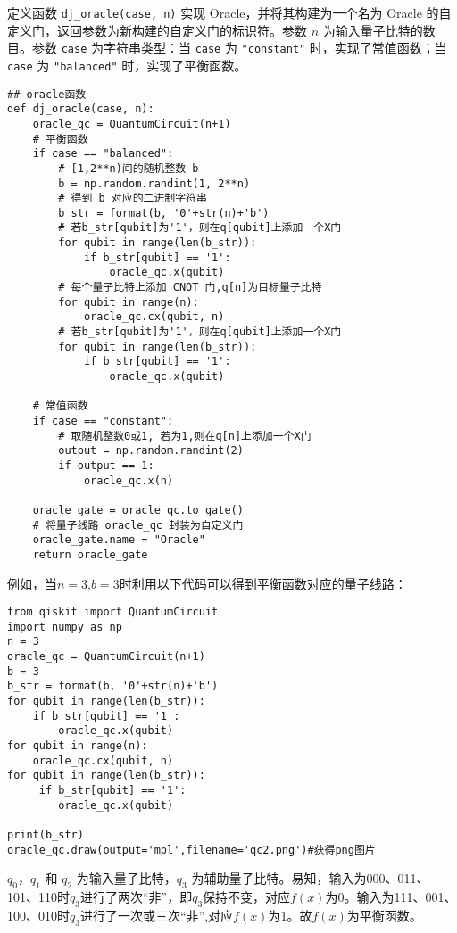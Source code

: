 定义函数 \texttt{dj\_oracle(case, n)} 实现 Oracle，并将其构建为一个名为 Oracle 的自定义门，返回参数为新构建的自定义门的标识符。参数 $n$ 为输入量子比特的数目。参数 \texttt{case} 为字符串类型：当 \texttt{case} 为 \texttt{"constant"} 时，实现了常值函数；当 \texttt{case} 为 \texttt{"balanced"} 时，实现了平衡函数。
\begin{py}
\begin{lstlisting}
## oracle函数
def dj_oracle(case, n):
    oracle_qc = QuantumCircuit(n+1)
    # 平衡函数
    if case == "balanced":
        # [1,2**n)间的随机整数 b
        b = np.random.randint(1, 2**n)
        # 得到 b 对应的二进制字符串
        b_str = format(b, '0'+str(n)+'b')
        # 若b_str[qubit]为'1'，则在q[qubit]上添加一个X门
        for qubit in range(len(b_str)):
            if b_str[qubit] == '1':
                oracle_qc.x(qubit)
        # 每个量子比特上添加 CNOT 门,q[n]为目标量子比特
        for qubit in range(n):
            oracle_qc.cx(qubit, n)
        # 若b_str[qubit]为'1'，则在q[qubit]上添加一个X门
        for qubit in range(len(b_str)):
            if b_str[qubit] == '1':
                oracle_qc.x(qubit)

    # 常值函数
    if case == "constant":
        # 取随机整数0或1, 若为1,则在q[n]上添加一个X门
        output = np.random.randint(2)
        if output == 1:
            oracle_qc.x(n)

    oracle_gate = oracle_qc.to_gate()
    # 将量子线路 oracle_qc 封装为自定义门
    oracle_gate.name = "Oracle"
    return oracle_gate
\end{lstlisting}
\end{py}

例如，当$n=3$,$b=3$时利用以下代码可以得到平衡函数对应的量子线路：
\begin{py}
\begin{lstlisting}
from qiskit import QuantumCircuit 
import numpy as np
n = 3
oracle_qc = QuantumCircuit(n+1)
b = 3
b_str = format(b, '0'+str(n)+'b')
for qubit in range(len(b_str)):
    if b_str[qubit] == '1':
        oracle_qc.x(qubit)
for qubit in range(n):
    oracle_qc.cx(qubit, n)
for qubit in range(len(b_str)):
     if b_str[qubit] == '1':
        oracle_qc.x(qubit)
         
print(b_str)
oracle_qc.draw(output='mpl',filename='qc2.png')#获得png图片
\end{lstlisting}
\end{py}
$q_0$，$q_1$ 和 $q_2$ 为输入量子比特，$q_3$ 为辅助量子比特。易知，输入为000、011、101、110时$q_3$进行了两次“非”，即$q_3$保持不变，对应$f(x)$为0。输入为111、001、100、010时$q_3$进行了一次或三次“非”,对应$f(x)$为1。故$f(x)$为平衡函数。

